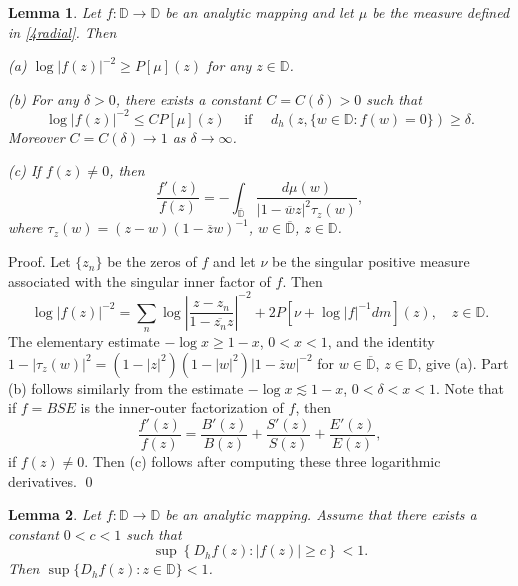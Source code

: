 \documentclass[a4paper,12pt]{article}
\newtheorem{lem}{Lemma}[section]
\theoremstyle{definition}
\numberwithin{equation}{section}
\newcommand{\D}{\mathbb D}
\begin{document}
\begin{lem}
\label{lemma3}
Let $f: \D \rightarrow \D$ be an analytic mapping and let $\mu$ be the measure defined in \eqref{4radial}. Then

(a) $\log |f(z)|^{-2} \geqslant P[\mu](z)$ for any $ z \in \mathbb{D}$.

(b) For any $\delta>0$, there exists a constant $C=C(\delta)>0$ such that
\begin{equation*}
   \log |f(z)|^{-2} \leq C P [\mu ] (z) \quad \text { if } \quad d_{h}(z,\{w \in \mathbb{D} : f(w)=0 \}) \geqslant \delta.  
\end{equation*}
Moreover $C=C(\delta) \to 1$ as $\delta \to \infty$.

(c) If $f(z) \neq 0$, then 
$$
\frac{f'(z)}{f(z)}  = - \int_{\overline{\D}} \frac{d \mu (w)}{|1- \overline{w} z|^2 \tau_z (w)},  
$$
where $\tau_z (w) = (z-w)(1 - \overline{z} w)^{-1}$, $w \in \overline{\D}$, $z \in \D$.
\end{lem}

Proof. Let $\{z_n \}$ be the zeros of $f$ and let $\nu$ be the singular positive measure associated with the singular inner factor of $f$. Then
$$
\log |f(z)|^{-2}=\sum_{n} \log \left|\frac{z-z_{n}}{1-\overline{z_{n}} z}\right|^{-2}+2 P[\nu + \log |f|^{-1} dm](z), \quad z \in \mathbb{D} .
$$
The elementary estimate $-\log x \geqslant 1-x$, $0<x<1$, and the identity $1- |\tau_z (w)|^2 = (1-|z|^2)(1- |w|^2) |1 - \overline{z} w|^{-2}$ for $w \in \overline{\D}$, $z \in \D$, give (a). Part (b) follows similarly from the estimate $-\log x \lesssim 1-x$, $0<\delta <x<1$. Note that if $f=BSE$ is the inner-outer factorization of $f$, then
$$
\frac{f'(z)}{f(z)} = \frac{B'(z)}{B(z)} + \frac{S'(z)}{S(z)} + \frac{E'(z)}{E(z)}, 
$$
if $f(z) \neq 0$. Then (c) follows after computing these three logarithmic derivatives.
\qed

\begin{lem}
\label{primer}    
Let $f: \mathbb{D} \rightarrow \mathbb{D}$ be an analytic mapping. Assume that there exists a constant $0<c<1$ such that
\begin{equation}
    \label{1*}
\sup \left\{D_{h} f(z) :|f(z)| \geqslant c\right\}<1 .
\end{equation} 
Then $\sup \{D_{h} f(z): z \in \mathbb{D}\}<1$.
\end{lem} 
\end{document}
